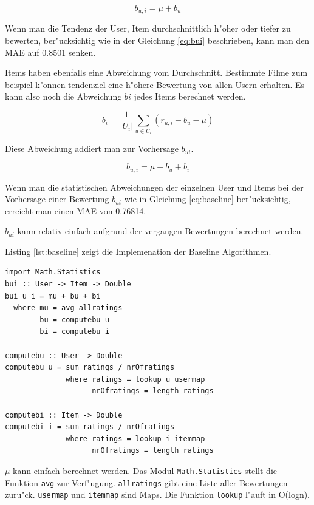 \documentclass[a4paper, 12pt]{article}
\begin{document}
\begin{equation}
  \label{eq:bui}
  b_{u,i} = \mu + b_u
\end{equation}

Wenn man die Tendenz der User, Item durchschnittlich h"oher oder tiefer zu bewerten, ber"ucksichtig wie in der Gleichung \ref{eq:bui} beschrieben, kann man den MAE auf 0.8501 senken. 

Items haben ebenfalls eine Abweichung vom Durchschnitt. Bestimmte Filme zum beispiel k"onnen tendenziel eine h"ohere Bewertung von allen Usern erhalten. Es kann also noch die Abweichung $bi$ jedes Items berechnet werden.

\begin{equation}
  \label{eq:bi}
  b_i = \frac{1}{|U_i|}\sum_{u \in U_i}(r_{u,i} - b_u - \mu)
\end{equation}

Diese Abweichung addiert man zur Vorhersage $b_{ui}$.

\begin{equation}
  \label{eq:baseline}
  b_{u,i} = \mu + b_u + b_i
\end{equation}

Wenn man die statistischen Abweichungen der einzelnen User und Items bei der Vorhersage einer Bewertung $b_{ui}$ wie in Gleichung \ref{eq:baseline} ber"ucksichtig, erreicht man einen MAE von 0.76814.

$b_{ui}$ kann relativ einfach aufgrund der vergangen Bewertungen berechnet werden.

Listing \ref{lst:baseline} zeigt die Implemenation der Baseline Algorithmen.

\begin{lstlisting}[caption=Baseline predictor, label=lst:baseline]
import Math.Statistics
bui :: User -> Item -> Double
bui u i = mu + bu + bi
  where mu = avg allratings
        bu = computebu u
        bi = computebu i

computebu :: User -> Double
computebu u = sum ratings / nrOfratings
              where ratings = lookup u usermap
                    nrOfratings = length ratings

computebi :: Item -> Double
computebi i = sum ratings / nrOfratings
              where ratings = lookup i itemmap
                    nrOfratings = length ratings
\end{lstlisting}

$\mu$ kann einfach berechnet werden. Das Modul \verb|Math.Statistics| stellt die Funktion \verb|avg| zur Verf"ugung. \verb|allratings| gibt eine Liste aller Bewertungen zuru"ck. \verb|usermap| und \verb|itemmap| sind Maps. Die Funktion \verb|lookup| l"auft in O(logn).
\end{document}
